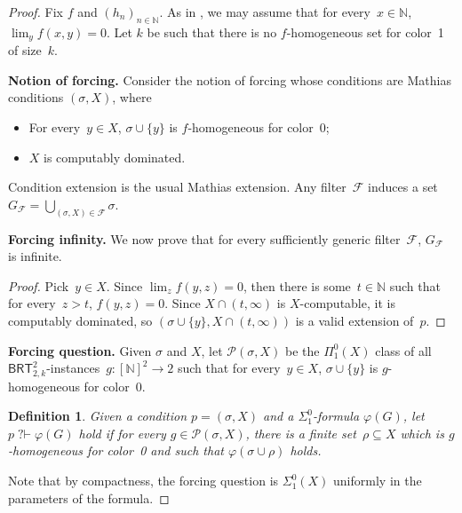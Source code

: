 \documentclass{article}
\def\F{\mathcal{F}}
\def\P{\mathcal{P}}
\newcommand{\qvdash}{\operatorname{{?}{\vdash}}}
\newcommand{\BRT}[0]{\mathsf{BRT}}
\newcommand{\NN}[0]{\mathbb{N}}
\numberwithin{theorem}{section}
\newtheorem{lemma}[theorem]{Lemma}
\newtheorem{definition}[theorem]{Definition}
\begin{document}
\begin{proof}
Fix $f$ and $(h_n)_{n \in \NN}$. As in , we may assume that for every~$x \in \NN$, $\lim_y f(x, y) = 0$. Let $k$ be such that there is no $f$-homogeneous set for color~1 of size~$k$.
\bigskip

\noindent
\textbf{Notion of forcing.}
Consider the notion of forcing whose conditions are Mathias conditions $(\sigma, X)$, where
\begin{itemize}
    \item[(1)] For every~$y \in X$, $\sigma \cup \{y\}$ is $f$-homogeneous for color~0;
    \item[(2)] $X$ is computably dominated.
\end{itemize}
Condition extension is the usual Mathias extension. Any filter~$\F$ induces a set~$G_\F = \bigcup_{(\sigma, X) \in \F} \sigma$.
\bigskip

\noindent
\textbf{Forcing infinity.}
We now prove that for every sufficiently generic filter~$\F$, $G_\F$ is infinite.

\begin{proof}
Pick~$y \in X$. Since $\lim_z f(y, z) = 0$, then there is some~$t \in \NN$ such that for every~$z > t$, $f(y, z) = 0$.
Since $X \cap (t, \infty)$ is $X$-computable, it is computably dominated, so $(\sigma \cup \{y\}, X \cap (t, \infty))$ is a valid extension of~$p$.
\end{proof}
\bigskip

\noindent
\textbf{Forcing question.}
Given $\sigma$ and $X$, let $\P(\sigma, X)$ be the $\Pi^0_1(X)$ class of all $\BRT^2_{2,k}$-instances~$g : [\NN]^2 \to 2$ such that for every~$y \in X$, $\sigma \cup \{y\}$ is $g$-homogeneous for color~0.

\begin{definition}
Given a condition $p = (\sigma, X)$ and a $\Sigma^0_1$-formula $\varphi(G)$, let $p \qvdash \varphi(G)$ hold if for every $g \in \P(\sigma, X)$, there is a finite set~$\rho \subseteq X$ which is $g$-homogeneous for color~0 and such that $\varphi(\sigma \cup \rho)$ holds.
\end{definition}

Note that by compactness, the forcing question is $\Sigma^0_1(X)$ uniformly in the parameters of the formula.


\end{proof}
\end{document}
